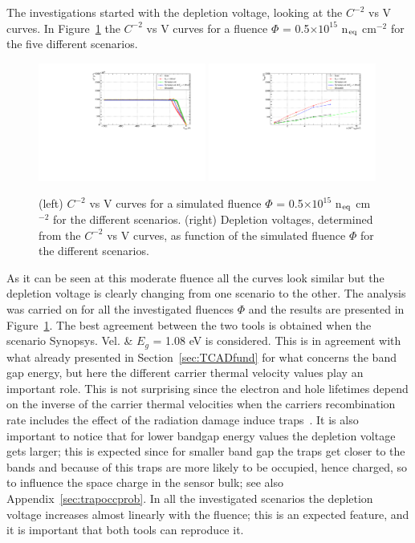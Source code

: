 The investigations started with the depletion voltage, looking at the  $C^{-2}$ vs V curves.
In Figure~\ref{fig:vdepl_Perugia_2015} the $C^{-2}$ vs V curves for a fluence 
$\Phi$ =  0.5$\times10^{15}$ n$_{\rm eq}$ cm$^{-2}$ for the five different scenarios.
\begin{figure}[!htpb]
\centering
\includegraphics[width=0.49\textwidth]{C2V_no_mult_Perugia_fl5e14.pdf}
\includegraphics[width=0.49\textwidth]{vdepl_Perugia_2015.pdf}
\caption{\label{fig:vdepl_Perugia_2015}(left) $C^{-2}$ vs V curves for a simulated fluence $\Phi$ =  0.5$\times10^{15}$ n$_{\rm eq}$ cm$^{-2}$ for the  different scenarios. (right) Depletion voltages, determined from the $C^{-2}$ vs V curves, as function of the simulated fluence $\Phi$ for the  different scenarios.}
\end{figure}

As it can be seen at this moderate fluence all the curves look similar but the depletion voltage is clearly 
changing from one scenario to the other.
The analysis was carried on for all the investigated fluences $\Phi$  and the results are presented in 
Figure~\ref{fig:vdepl_Perugia_2015}. The best agreement between the two tools is obtained 
when the scenario Synopsys. Vel. \& $E_g$ = 1.08 eV is considered. This is in agreement with what already 
presented in Section~\ref{sec:TCADfund} for what concerns the band gap energy, 
but here the different carrier thermal velocity values play 
an important role. This is not surprising since the  electron and hole 
lifetimes  depend on the inverse of the carrier thermal velocities when the carriers recombination rate 
includes the effect of the radiation damage induce traps~\cite{moll-thesis}. It is also important to notice 
that for lower bandgap energy values the depletion voltage gets larger; this is expected since for smaller 
band gap the traps get closer to the bands and because of this traps are more likely to be occupied, hence charged, so to influence the space charge in the sensor bulk; see also Appendix~\ref{sec:trapoccprob}.
In all the investigated scenarios the depletion voltage increases almost linearly with the fluence; this 
is an expected feature, and it is important that both tools can reproduce it.

